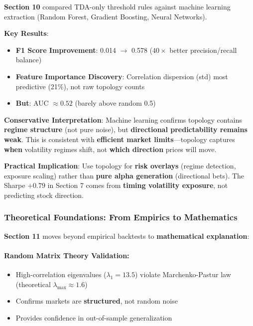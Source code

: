 \textbf{Section 10} compared TDA-only threshold rules against machine learning extraction (Random Forest, Gradient Boosting, Neural Networks).

\textbf{Key Results}:
\begin{itemize}
\item \textbf{F1 Score Improvement}: 0.014 $\rightarrow$ 0.578 ($40\times$ better precision/recall balance)
\item \textbf{Feature Importance Discovery}: Correlation dispersion (std) most predictive (21\%), not raw topology counts
\item \textbf{But}: AUC $\approx 0.52$ (barely above random 0.5)
\end{itemize}

\textbf{Conservative Interpretation}: Machine learning confirms topology contains \textbf{regime structure} (not pure noise), but \textbf{directional predictability remains weak}. This is consistent with \textbf{efficient market limits}---topology captures \textbf{when} volatility regimes shift, not \textbf{which direction} prices will move.

\textbf{Practical Implication}: Use topology for \textbf{risk overlays} (regime detection, exposure scaling) rather than \textbf{pure alpha generation} (directional bets). The Sharpe $+0.79$ in Section 7 comes from \textbf{timing volatility exposure}, not predicting stock direction.

\subsubsection{Theoretical Foundations: From Empirics to Mathematics}

\textbf{Section 11} moves beyond empirical backtests to \textbf{mathematical explanation}:

\paragraph{Random Matrix Theory Validation:}
\begin{itemize}
\item High-correlation eigenvalues ($\lambda_1 = 13.5$) violate Marchenko-Pastur law (theoretical $\lambda_{\text{max}} \approx 1.6$)
\item Confirms markets are \textbf{structured}, not random noise
\item Provides confidence in out-of-sample generalization
\end{itemize}

